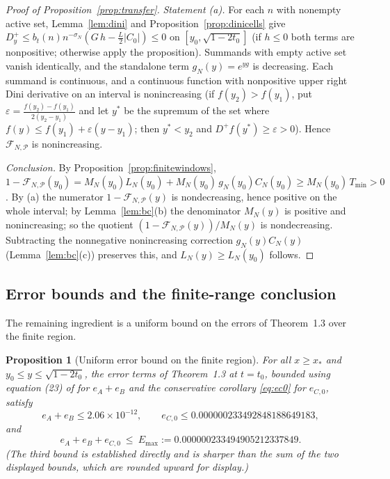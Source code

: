 \documentclass[11pt]{article}
\newtheorem{proposition}[theorem]{Proposition}
\theoremstyle{definition}
\newcommand{\eps}{\varepsilon}
\newcommand{\calP}{\mathcal{P}}
\begin{document}
\begin{proof}[Proof of Proposition~\ref{prop:transfer}]
\emph{Statement (a).} For each $n$ with nonempty active set,
Lemma~\ref{lem:dini} and Proposition~\ref{prop:dinicells} give
$D^+_y\le b_t(n)n^{-\sigma_N}(G\,h-\frac L2|C_0|)\le0$ on
$[y_0,\sqrt{1-2t_0}]$ (if $h\le0$ both terms are nonpositive;
otherwise apply the proposition). Summands with empty active set
vanish identically, and the standalone term $g_N(y)=e^{yg}$ is
decreasing. Each summand is continuous, and a continuous function
with nonpositive upper right Dini derivative on an interval is
nonincreasing (if $f(y_2)>f(y_1)$, put
$\eps=\frac{f(y_2)-f(y_1)}{2(y_2-y_1)}$ and let $y^*$ be the
supremum of the set where $f(y)\le f(y_1)+\eps(y-y_1)$; then
$y^*<y_2$ and $D^+f(y^*)\ge\eps>0$). Hence
$\mathcal F_{N,\calP}$ is nonincreasing.

\emph{Conclusion.} By Proposition~\ref{prop:finitewindows},
$1-\mathcal F_{N,\calP}(y_0)=M_N(y_0)L_N(y_0)+M_N(y_0)\,
g_N(y_0)C_N(y_0)\ge M_N(y_0)\,T_{\min}>0$. By (a) the numerator
$1-\mathcal F_{N,\calP}(y)$ is nondecreasing, hence positive on the
whole interval; by Lemma~\ref{lem:bc}(b) the denominator $M_N(y)$
is positive and nonincreasing; so the quotient
$(1-\mathcal F_{N,\calP}(y))/M_N(y)$ is nondecreasing. Subtracting
the nonnegative nonincreasing correction $g_N(y)C_N(y)$
(Lemma~\ref{lem:bc}(c)) preserves this, and
$L_N(y)\ge L_N(y_0)$ follows.
\end{proof}

\subsection{Error bounds and the finite-range conclusion}
\label{sec:finiteerr}

The remaining ingredient is a uniform bound on the errors of
Theorem~1.3 over the finite region.

\begin{proposition}[Uniform error bound on the finite region]
\label{prop:finiteerr}
For all $x\ge x_*$ and $y_0\le y\le\sqrt{1-2t_0}$, the error terms
of Theorem~1.3 at $t=t_0$, bounded using equation (23) of
\cite{Polymath} for $e_A+e_B$ and the conservative corollary
\eqref{eq:ec0} for $e_{C,0}$, satisfy
\[
e_A+e_B\le2.06\times10^{-12},\qquad
e_{C,0}\le0.000000233492848188649183,
\]
and
\[
e_A+e_B+e_{C,0}\ \le\ E_{\max}:=0.000000233494905212337849 .
\]
(The third bound is established directly and is sharper than the
sum of the two displayed bounds, which are rounded upward for
display.)
\end{proposition}
\end{document}
